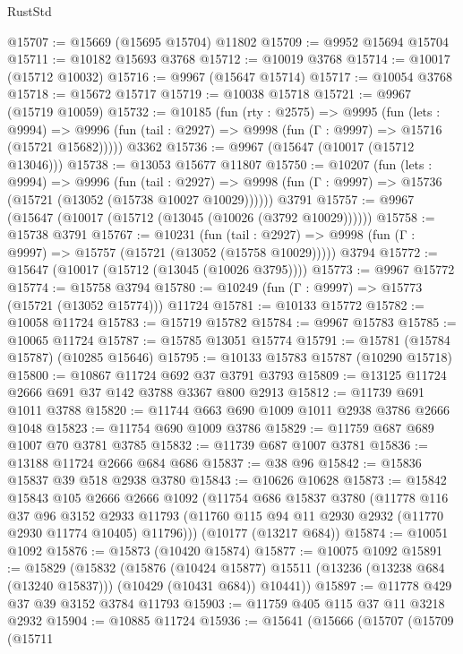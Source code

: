 \begin{lexlean}{RustStd}
\begin{coremodule}
@15707 := @15669 (@15695 @15704) @11802
@15709 := @9952 @15694 @15704
@15711 := @10182 @15693 @3768
@15712 := @10019 @3768
@15714 := @10017 (@15712 @10032)
@15716 := @9967 (@15647 @15714)
@15717 := @10054 @3768
@15718 := @15672 @15717
@15719 := @10038 @15718
@15721 := @9967 (@15719 @10059)
@15732 := @10185
    (fun (rty : @2575) =>
    @9995
      (fun (lets : @9994) =>
      @9996 (fun (tail : @2927) => @9998 (fun (Γ : @9997) => @15716 (@15721 @15682)))))
    @3362
@15736 := @9967 (@15647 (@10017 (@15712 @13046)))
@15738 := @13053 @15677 @11807
@15750 := @10207
    (fun (lets : @9994) =>
    @9996
      (fun (tail : @2927) =>
      @9998 (fun (Γ : @9997) => @15736 (@15721 (@13052 (@15738 @10027 @10029))))))
    @3791
@15757 := @9967 (@15647 (@10017 (@15712 (@13045 (@10026 (@3792 @10029))))))
@15758 := @15738 @3791
@15767 := @10231
    (fun (tail : @2927) => @9998 (fun (Γ : @9997) => @15757 (@15721 (@13052 (@15758 @10029)))))
    @3794
@15772 := @15647 (@10017 (@15712 (@13045 (@10026 @3795))))
@15773 := @9967 @15772
@15774 := @15758 @3794
@15780 := @10249 (fun (Γ : @9997) => @15773 (@15721 (@13052 @15774))) @11724
@15781 := @10133 @15772
@15782 := @10058 @11724
@15783 := @15719 @15782
@15784 := @9967 @15783
@15785 := @10065 @11724
@15787 := @15785 @13051 @15774
@15791 := @15781 (@15784 @15787) (@10285 @15646)
@15795 := @10133 @15783 @15787 (@10290 @15718)
@15800 := @10867 @11724 @692 @37 @3791 @3793
@15809 := @13125 @11724 @2666 @691 @37 @142 @3788 @3367 @800 @2913
@15812 := @11739 @691 @1011 @3788
@15820 := @11744 @663 @690 @1009 @1011 @2938 @3786 @2666 @1048
@15823 := @11754 @690 @1009 @3786
@15829 := @11759 @687 @689 @1007 @70 @3781 @3785
@15832 := @11739 @687 @1007 @3781
@15836 := @13188 @11724 @2666 @684 @686
@15837 := @38 @96
@15842 := @15836 @15837 @39 @518 @2938 @3780
@15843 := @10626 @10628
@15873 := @15842
    @15843
    @105
    @2666
    @2666
    @1092
    (@11754
      @686
      @15837
      @3780
      (@11778
        @116
        @37
        @96
        @3152
        @2933
        @11793
        (@11760 @115 @94 @11 @2930 @2932 (@11770 @2930 @11774 @10405) @11796)))
    (@10177 (@13217 @684))
@15874 := @10051 @1092
@15876 := @15873 (@10420 @15874)
@15877 := @10075 @1092
@15891 := @15829
    (@15832
      (@15876
        (@10424 @15877)
        @15511
        (@13236 (@13238 @684 (@13240 @15837)))
        (@10429 (@10431 @684))
        @10441))
@15897 := @11778 @429 @37 @39 @3152 @3784 @11793
@15903 := @11759 @405 @115 @37 @11 @3218 @2932
@15904 := @10885 @11724
@15936 := @15641
    (@15666
      (@15707
        (@15709
          (@15711

\end{coremodule}
\end{lexlean}
